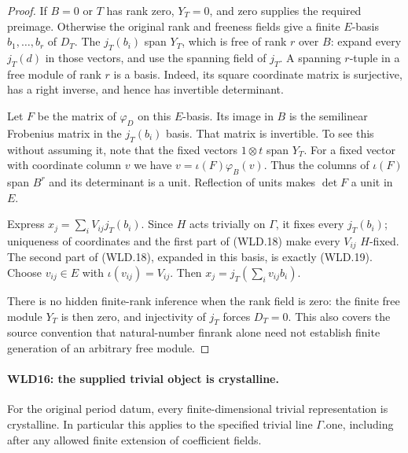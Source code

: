 \begin{proof}
If $B=0$ or $T$ has rank zero, $Y_T=0$, and zero supplies the
required preimage. Otherwise the original rank and freeness
fields give a finite $E$-basis $b_1,\ldots,b_r$ of $D_T$.
The $j_T(b_i)$ span $Y_T$, which is free of rank $r$ over $B$:
expand every $j_T(d)$ in those vectors, and use the spanning
field of $j_T$. A spanning $r$-tuple in a free module of rank $r$
is a basis. Indeed, its square coordinate matrix is surjective,
has a right inverse, and hence has invertible determinant.

Let $F$ be the matrix of $\varphi_D$ on this $E$-basis. Its
image in $B$ is the semilinear Frobenius matrix in the
$j_T(b_i)$ basis. That matrix is invertible. To see this without
assuming it, note that the fixed vectors $1\otimes t$ span $Y_T$.
For a fixed vector with coordinate column $v$ we have
$v=\iota(F)\varphi_B(v)$. Thus the columns of $\iota(F)$ span
$B^r$ and its determinant is a unit. Reflection of units makes
$\det F$ a unit in $E$.

Express $x_j=\sum_iV_{ij}j_T(b_i)$. Since $H$ acts trivially
on $\Gamma$, it fixes every $j_T(b_i)$; uniqueness of coordinates
and the first part of (WLD.18) make every $V_{ij}$ $H$-fixed.
The second part of (WLD.18), expanded in this basis, is exactly
(WLD.19). Choose $v_{ij}\in E$ with $\iota(v_{ij})=V_{ij}$.
Then $x_j=j_T(\sum_i v_{ij}b_i)$.

There is no hidden finite-rank inference when the rank field is
zero: the finite free module $Y_T$ is then zero, and injectivity
of $j_T$ forces $D_T=0$. This also covers the source convention
that natural-number finrank alone need not establish finite
generation of an arbitrary free module.
\end{proof}

\paragraph{WLD16: the supplied trivial object is crystalline.}
\label{claim:WLD16}
For the original period datum, every finite-dimensional trivial
representation is crystalline. In particular this applies to the
specified trivial line $\Gamma.\mathrm{one}$, including after any
allowed finite extension of coefficient fields.

